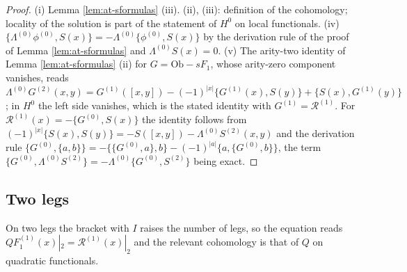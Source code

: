\documentclass[11pt]{article}
\numberwithin{equation}{section}
\theoremstyle{plain}
\theoremstyle{definition}
\newcommand{\Ob}{\mathrm{Ob}}
\begin{document}
\begin{proof}
(i) Lemma \ref{lem:at-sformulas} (iii). (ii), (iii): definition of the cohomology; locality of the solution is part of the statement of $H^0$ on local functionals. (iv) $\{\Lambda^{(0)}\phi^{(0)},S(x)\}=-\Lambda^{(0)}\{\phi^{(0)},S(x)\}$ by the derivation rule of the proof of Lemma \ref{lem:at-sformulas} and $\Lambda^{(0)}S(x)=0$. (v) The arity-two identity of Lemma \ref{lem:at-sformulas} (ii) for $G=\Ob-sF_1$, whose arity-zero component vanishes, reads $\Lambda^{(0)}G^{(2)}(x,y)=G^{(1)}([x,y])-(-1)^{|x|}\{G^{(1)}(x),S(y)\}+\{S(x),G^{(1)}(y)\}$; in $H^0$ the left side vanishes, which is the stated identity with $G^{(1)}=\mathcal R^{(1)}$. For $\mathcal R^{(1)}(x)=-\{G^{(0)},S(x)\}$ the identity follows from $(-1)^{|x|}\{S(x),S(y)\}=-S([x,y])-\Lambda^{(0)}S^{(2)}(x,y)$ and the derivation rule $\{G^{(0)},\{a,b\}\}=-\{\{G^{(0)},a\},b\}-(-1)^{|a|}\{a,\{G^{(0)},b\}\}$, the term $\{G^{(0)},\Lambda^{(0)}S^{(2)}\}=-\Lambda^{(0)}\{G^{(0)},S^{(2)}\}$ being exact.
\end{proof}

\subsection{Two legs}

On two legs the bracket with $I$ raises the number of legs, so the equation reads $QF_1^{(1)}(x)|_2=\mathcal R^{(1)}(x)|_2$ and the relevant cohomology is that of $Q$ on quadratic functionals.
\end{document}
